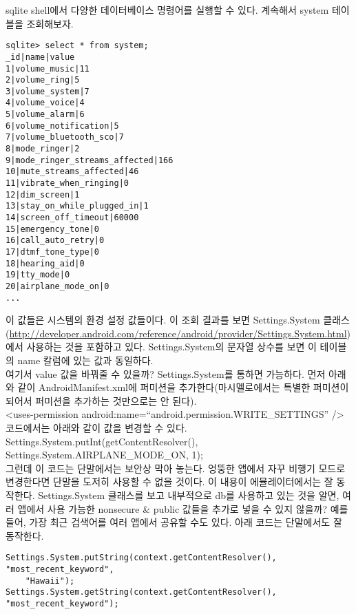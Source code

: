 sqlite shell에서 다양한 데이터베이스 명령어를 실행할 수 있다. 계속해서 system 테이블을 조회해보자.
\begin{lstlisting}[frame=single] 
sqlite> select * from system;
_id|name|value
1|volume_music|11
2|volume_ring|5
3|volume_system|7
4|volume_voice|4
5|volume_alarm|6
6|volume_notification|5
7|volume_bluetooth_sco|7
8|mode_ringer|2
9|mode_ringer_streams_affected|166
10|mute_streams_affected|46
11|vibrate_when_ringing|0
12|dim_screen|1
13|stay_on_while_plugged_in|1
14|screen_off_timeout|60000
15|emergency_tone|0
16|call_auto_retry|0
17|dtmf_tone_type|0
18|hearing_aid|0
19|tty_mode|0
20|airplane_mode_on|0
...
\end{lstlisting}
이 값들은 시스템의 환경 설정 값들이다. 이 조회 결과를 보면 Settings.System 클래스(\url{http://developer.android.com/reference/android/provider/Settings.System.html})에서 사용하는 것을 포함하고 있다. Settings.System의 문자열 상수를 보면 이 테이블의 name 칼럼에 있는 값과 동일하다.\\

여기서 value 값을 바꿔줄 수 있을까? Settings.System를 통하면 가능하다.
먼저 아래와 같이 AndroidManifest.xml에 퍼미션을 추가한다(마시멜로에서는 특별한 퍼미션이 되어서 퍼미션을 추가하는 것만으로는 안 된다).\\

<uses-permission android:name=``android.permission.WRITE\_SETTINGS'' />\\

코드에서는 아래와 같이 값을 변경할 수 있다.\\

Settings.System.putInt(getContentResolver(), Settings.System.AIRPLANE\_MODE\_ON, 1);\\

그런데 이 코드는 단말에서는 보안상 막아 놓는다. 엉뚱한 앱에서 자꾸 비행기 모드로 변경한다면 단말을 도저히 사용할 수 없을 것이다.
이 내용이 에뮬레이터에서는 잘 동작한다.
Settings.System 클래스를 보고 내부적으로 db를 사용하고 있는 것을 알면, 여러 앱에서 사용 가능한 nonsecure \& public 값들을 추가로 넣을 수 있지 않을까? 예를 들어, 가장 최근 검색어를 여러 앱에서 공유할 수도 있다.
아래 코드는 단말에서도 잘 동작한다. \\
\begin{lstlisting}[frame=single]
Settings.System.putString(context.getContentResolver(), "most_recent_keyword",
	"Hawaii");
Settings.System.getString(context.getContentResolver(), "most_recent_keyword");
\end{lstlisting}

